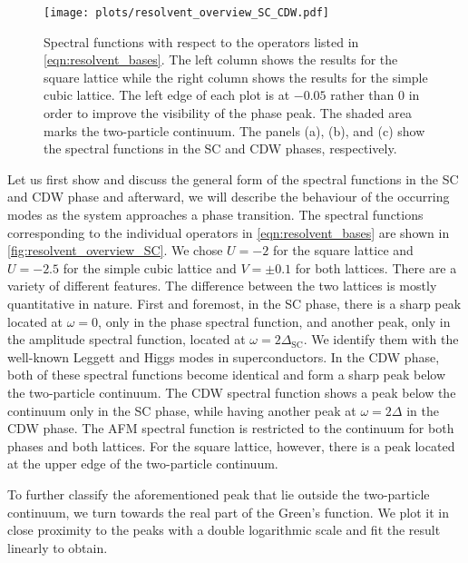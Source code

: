 \documentclass[
    reprint, 
    aps,
    preprintnumbers,
    twocolumn,
    prb,
    superscriptaddress
]{revtex4-2}
\begin{document}
\begin{figure}
    \centering
    \texttt{[image: plots/resolvent\_overview\_SC\_CDW.pdf]}
    \caption{Spectral functions with respect to the operators listed in \eqref{eqn:resolvent_bases}.
    The left column shows the results for the square lattice while the right column shows the results for the simple cubic lattice.
    The left edge of each plot is at $-0.05$ rather than $0$ in order to improve the visibility of the phase peak.
    The shaded area marks the two-particle continuum.
    The panels (a), (b), and (c) show the spectral functions in the SC and CDW phases, respectively.}
    \label{fig:resolvent_overview_SC}
\end{figure}

Let us first show and discuss the general form of the spectral functions in the SC and CDW phase and afterward, 
we will describe the behaviour of the occurring modes as the system approaches a phase transition.
\newline
The spectral functions corresponding to the individual operators in \eqref{eqn:resolvent_bases} are shown in \autoref{fig:resolvent_overview_SC}.
We chose $U=-2$ for the square lattice and $U=-2.5$ for the simple cubic lattice and $V=\pm0.1$ for both lattices.
\newline
There are a variety of different features. The difference between the two lattices is mostly quantitative in nature.
First and foremost, in the SC phase, there is a sharp peak located at $\omega=0$, only in the phase spectral function,
and another peak, only in the amplitude spectral function, located at $\omega=2\Delta_\text{SC}$.
We identify them with the well-known Leggett and Higgs modes in superconductors.
In the CDW phase, both of these spectral functions become identical and form a sharp peak below the two-particle continuum.
\newline
The CDW spectral function shows a peak below the continuum only in the SC phase, while having another peak at $\omega=2\Delta$ in the CDW phase.
The AFM spectral function is restricted to the continuum for both phases and both lattices.
For the square lattice, however, there is a peak located at the upper edge of the two-particle continuum.

To further classify the aforementioned peak that lie outside the two-particle continuum,
we turn towards the real part of the Green's function.
We plot it in close proximity to the peaks with a double logarithmic scale and fit the result linearly to obtain.
\end{document}
